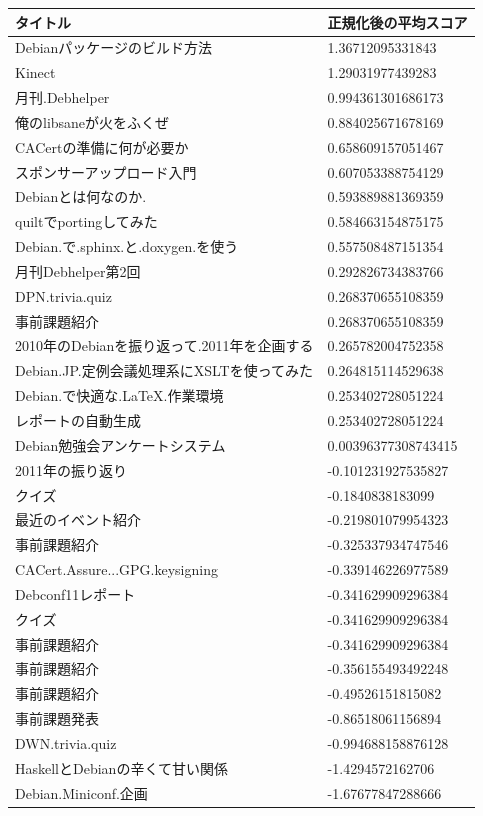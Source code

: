 \documentclass[mingoth,a4paper]{jsarticle}
\begin{document}
\begin{multicols}{2}
 \begin{center}
 {\small
 \begin{tabular}{|p{15em}|l|}
 \hline
 タイトル & 正規化後の平均スコア \\
 \hline
 Debianパッケージのビルド方法&1.36712095331843\\
 Kinect&1.29031977439283\\
 月刊.Debhelper&0.994361301686173\\
 俺のlibsaneが火をふくぜ&0.884025671678169\\
 CACertの準備に何が必要か&0.658609157051467\\
 スポンサーアップロード入門&0.607053388754129\\
 Debianとは何なのか.&0.593889881369359\\
 quiltでportingしてみた&0.584663154875175\\
 Debian.で.sphinx.と.doxygen.を使う&0.557508487151354\\
 月刊Debhelper第2回&0.292826734383766\\
 DPN.trivia.quiz&0.268370655108359\\
 事前課題紹介&0.268370655108359\\
 2010年のDebianを振り返って.2011年を企画する&0.265782004752358\\
 Debian.JP.定例会議処理系にXSLTを使ってみた&0.264815114529638\\
 Debian.で快適な.LaTeX.作業環境&0.253402728051224\\
 レポートの自動生成&0.253402728051224\\
 Debian勉強会アンケートシステム&0.00396377308743415\\
 2011年の振り返り&-0.101231927535827\\
 クイズ&-0.1840838183099\\
 最近のイベント紹介&-0.219801079954323\\
 事前課題紹介&-0.325337934747546\\
 CACert.Assure...GPG.keysigning&-0.339146226977589\\
 Debconf11レポート&-0.341629909296384\\
 クイズ&-0.341629909296384\\
 事前課題紹介&-0.341629909296384\\
 事前課題紹介&-0.356155493492248\\
 事前課題紹介&-0.49526151815082\\
 事前課題発表&-0.86518061156894\\
 DWN.trivia.quiz&-0.994688158876128\\
 HaskellとDebianの辛くて甘い関係&-1.4294572162706\\
 Debian.Miniconf.企画&-1.67677847288666\\
 \hline
 \end{tabular}
 }
 \end{center}
\end{multicols}
\end{document}
